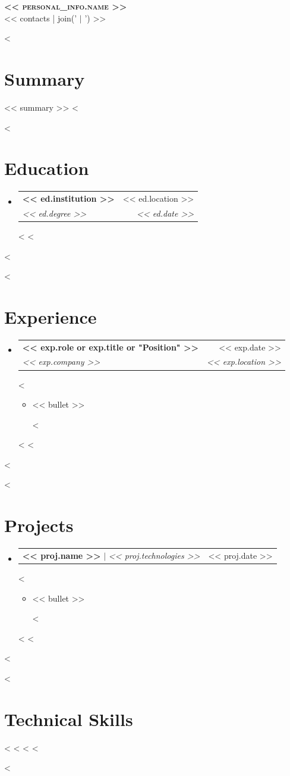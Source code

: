 \documentclass[letterpaper,11pt]{article}
\makeatletter
\newcommand{\resumeItem}[1]{
  \item\small{
    {#1 \vspace{-2pt}}
  }
}
\newcommand{\resumeSubheading}[4]{
  \vspace{-2pt}\item
    \begin{tabular*}{0.97\textwidth}[t]{l@{\extracolsep{\fill}}r}
      \textbf{#1} & #2 \\
      \textit{\small#3} & \textit{\small #4} \\
    \end{tabular*}\vspace{-7pt}
}
\newcommand{\resumeProjectHeading}[2]{
    \item
    \begin{tabular*}{0.97\textwidth}{l@{\extracolsep{\fill}}r}
      \small#1 & #2 \\
    \end{tabular*}\vspace{-7pt}
}
\newcommand{\resumeSubHeadingListStart}{\begin{itemize}[leftmargin=0.15in, label={}]}
\newcommand{\resumeSubHeadingListEnd}{\end{itemize}}
\newcommand{\resumeItemListStart}{\begin{itemize}}
\newcommand{\resumeItemListEnd}{\end{itemize}\vspace{-5pt}}
\makeatother
\begin{document}
\begin{center}
    \textbf{\Huge \scshape << personal_info.name >>} \\ \vspace{1pt}
    \small << contacts | join(' $|$ ') >>
\end{center}
<%
\section{Summary}
<< summary >>
<%

<%
\section{Education}
  \resumeSubHeadingListStart
    <%
    \resumeSubheading
      {<< ed.institution >>}{<< ed.location >>}
      {<< ed.degree >>}{<< ed.date >>}
      <%
    <%
  \resumeSubHeadingListEnd
<%

<%
\section{Experience}
  \resumeSubHeadingListStart
    <%
    \resumeSubheading
      {<< exp.role or exp.title or "Position" >>}{<< exp.date >>}
      {<< exp.company >>}{<< exp.location >>}
      <%
      \resumeItemListStart
        <%
        \resumeItem{<< bullet >>}
        <%
      \resumeItemListEnd
      <%
    <%
  \resumeSubHeadingListEnd
<%

<%
\section{Projects}
    \resumeSubHeadingListStart
      <%
      \resumeProjectHeading
          {\textbf{<< proj.name >>} $|$ \emph{<< proj.technologies >>}}{<< proj.date >>}
          <%
          \resumeItemListStart
            <%
            \resumeItem{<< bullet >>}
            <%
          \resumeItemListEnd
          <%
      <%
    \resumeSubHeadingListEnd
<%

<%
\section{Technical Skills}
 \begin{itemize}[leftmargin=0.15in, label={}]
 \small{\item{
 <%
 <%
 <%
 <%
 }}
 \end{itemize}
<%
\end{document}
